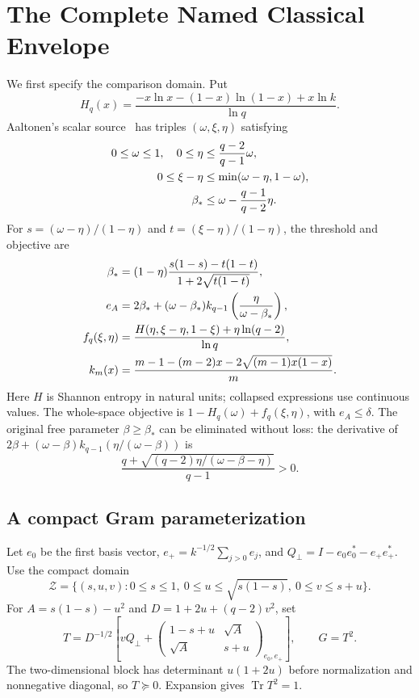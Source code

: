 \documentclass[12pt,letterpaper,onecolumn]{article}
\theoremstyle{definition}
\theoremstyle{remark}
\DeclareMathOperator{\Tr}{Tr}
\begin{document}
\section{The Complete Named Classical Envelope}\label{sec:classical}
We first specify the comparison domain. Put
\[
H_q(x)=\frac{-x\ln x-(1-x)\ln(1-x)+x\ln k}{\ln q}.
\]
Aaltonen's scalar source~\cite[Eq.~(9) and concluding theorem]{Aaltonen1990} has triples \((\omega,\xi,\eta)\) satisfying
\begin{align}
0\le\omega\le1,\quad
0\le\eta&\le\frac{q-2}{q-1}\omega,\notag\\
0\le\xi-\eta&\le\min(\omega-\eta,1-\omega),\label{eq:domain}\\
\beta_*&\le\omega-\frac{q-1}{q-2}\eta.\notag
\end{align}
For \(s=(\omega-\eta)/(1-\eta)\) and \(t=(\xi-\eta)/(1-\eta)\), the threshold and objective are
\begin{align}
\beta_*&=(1-\eta)\frac{s(1-s)-t(1-t)}{1+2\sqrt{t(1-t)}},\notag\\
e_A&=2\beta_*+(\omega-\beta_*)k_{q-1}
                 \left(\frac{\eta}{\omega-\beta_*}\right),\label{eq:source}\\
f_q(\xi,\eta)&=\frac{H(\eta,\xi-\eta,1-\xi)+\eta\ln(q-2)}{\ln q},\notag\\
k_m(x)&=\frac{m-1-(m-2)x-2\sqrt{(m-1)x(1-x)}}m.\notag
\end{align}
Here \(H\) is Shannon entropy in natural units; collapsed expressions use continuous values. The whole-space objective is \(1-H_q(\omega)+f_q(\xi,\eta)\), with \(e_A\le\delta\).
The original free parameter \(\beta\ge\beta_*\) can be eliminated without loss: the derivative of
\(2\beta+(\omega-\beta)k_{q-1}(\eta/(\omega-\beta))\) is
\[
\frac{q+\sqrt{(q-2)\eta/(\omega-\beta-\eta)}}{q-1}>0.
\]

\subsection{A compact Gram parameterization}
Let \(e_0\) be the first basis vector, \(e_+=k^{-1/2}\sum_{j>0}e_j\), and \(Q_\perp=I-e_0e_0^*-e_+e_+^*\). Use the compact domain
\[
\mathcal Z=\{(s,u,v):0\le s\le1,\ 0\le u\le\sqrt{s(1-s)},\
0\le v\le s+u\}.
\]
For \(A=s(1-s)-u^2\) and \(D=1+2u+(q-2)v^2\), set
\begin{equation}\label{eq:T}
T=D^{-1/2}\left[
vQ_\perp+
\begin{pmatrix}1-s+u&\sqrt A\\\sqrt A&s+u\end{pmatrix}_{e_0,e_+}
\right],\qquad G=T^2.
\end{equation}
The two-dimensional block has determinant \(u(1+2u)\) before normalization and nonnegative diagonal, so \(T\succeq0\). Expansion gives \(\Tr T^2=1\).
\end{document}
